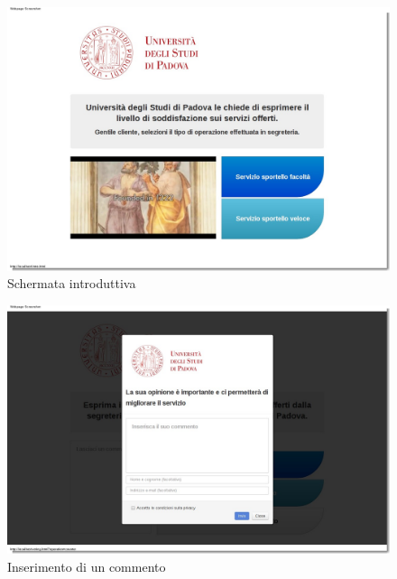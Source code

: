     \begin{figure}[!h]
    \begin{center}
        \includegraphics[scale=0.32]{icons/scorecard.png}
        \caption{Schermata introduttiva}
        \label{fig:scorecard}
    \end{center}
  \end{figure}
   \begin{figure}[!h]
    \begin{center}
        \includegraphics[scale=0.32]{icons/comment.png} 
        \caption{Inserimento di un commento}
        \label{fig:comment}
    \end{center}
  \end{figure}

